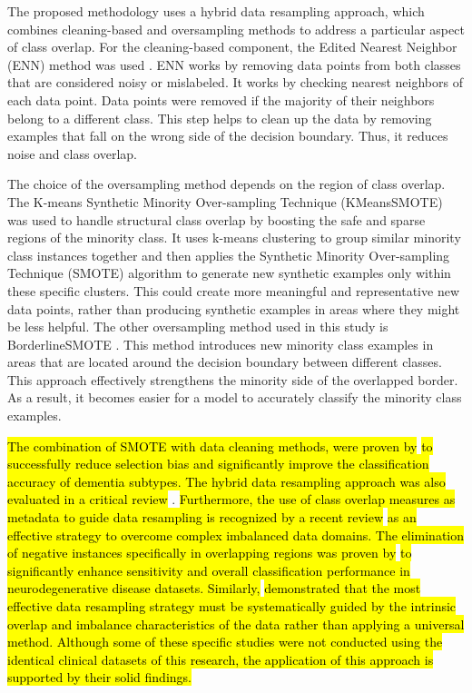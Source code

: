 The proposed methodology uses a hybrid data resampling approach, which combines cleaning-based and oversampling methods to address a particular aspect of class overlap. For the cleaning-based component, the Edited Nearest Neighbor (\acrshort{ENN}) method was used \cite{Wilson1972Asymptotic}. ENN works by removing data points from both classes that are considered noisy or mislabeled. It works by checking nearest neighbors of each data point. Data points were removed if the majority of their neighbors belong to a different class. This step helps to clean up the data by removing examples that fall on the wrong side of the decision boundary. Thus, it reduces noise and class overlap. 

The choice of the oversampling method depends on the region of class overlap. The K-means Synthetic Minority Over-sampling Technique (\acrshort{KMeansSMOTE}) \cite{Douzas2018Improving} was used to handle structural class overlap by boosting the safe and sparse regions of the minority class. It uses k-means clustering to group similar minority class instances together and then applies the Synthetic Minority Over-sampling Technique (\acrshort{SMOTE}) algorithm to generate new synthetic examples only within these specific clusters. This could create more meaningful and representative new data points, rather than producing synthetic examples in areas where they might be less helpful. The other oversampling method used in this study is \acrshort{BorderlineSMOTE} \cite{Han2005Borderline-SMOTE}. This method introduces new minority class examples in areas that are located around the decision boundary between different classes. This approach effectively strengthens the minority side of the overlapped border. As a result, it becomes easier for a model to accurately classify the minority class examples.

\hl{The combination of SMOTE with data cleaning methods, were proven by} \cite{Sharma2024Leveraging} \hl{to successfully reduce selection bias and significantly improve the classification accuracy of dementia subtypes. The hybrid data resampling approach was also evaluated in a critical review} \cite{Santos2022Joint}. \hl{Furthermore, the use of class overlap measures as metadata to guide data resampling is recognized by a recent review} \cite{Santos2023Unifying} \hl{as an effective strategy to overcome complex imbalanced data domains. The elimination of negative instances specifically in overlapping regions was proven by} \cite{Vuttipittayamongkol2020Improved} \hl{to significantly enhance sensitivity and overall classification performance in neurodegenerative disease datasets. Similarly,} \cite{Kraiem2021Selecting} \hl{demonstrated that the most effective data resampling strategy must be systematically guided by the intrinsic overlap and imbalance characteristics of the data rather than applying a universal method. Although some of these specific studies were not conducted using the identical clinical datasets of this research, the application of this approach is supported by their solid findings.}

